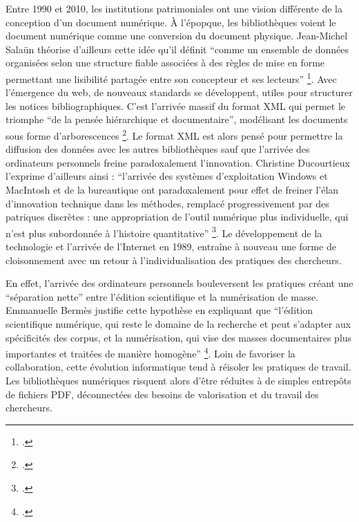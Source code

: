 Entre 1990 et 2010, les institutions patrimoniales ont une vision différente de la conception d'un document numérique. À l'épopque, les bibliothèques voient le document numérique comme une conversion du document physique. Jean-Michel Salaün théorise d'ailleurs cette idée qu'il définit \enquote{comme un ensemble de données organisées selon une structure fiable associées à des règles de mise en forme permettant une lisibilité partagée entre son concepteur et ses lecteurs} \footcite{pedauqueDocumentLumiereNumerique2006}. Avec l'émergence du web, de nouveaux standards se développent, utiles pour structurer les notices bibliographiques. C'est l'arrivée massif du format \ac{XML} qui permet le triomphe \enquote{de la pensée hiérarchique et documentaire}, modélisant les documents sous forme d'arborescences \footcite{bermesTroisAgesNumerique}. Le format \ac{XML} est alors pensé pour permettre la diffusion des données avec les autres bibliothèques sauf que l'arrivée des ordinateurs personnels freine paradoxalement l'innovation. Christine Ducourtieux l'exprime d'ailleurs ainsi : \enquote{l'arrivée des systèmes d'exploitation Windows et MacIntosh et de la bureautique ont paradoxalement pour effet de freiner l'élan d'innovation technique dans les méthodes, remplacé progressivement par des patriques discrètes : une appropriation de l'outil numérique plus individuelle, qui n'est plus subordonnée à l'histoire quantitative} \footcite{bermesTroisAgesNumerique}. Le développement de la technologie et l'arrivée de l'Internet en 1989, entraîne à nouveau une forme de cloisonnement avec un retour à l'individualisation des pratiques des chercheurs. 

En effet, l'arrivée des ordinateurs personnels bouleversent les pratiques créant une \enquote{séparation nette} entre l'édition scientifique et la numérisation de masse. Emmanuelle Bermès justifie cette hypothèse en expliquant que \enquote{l'édition scientifique numérique, qui reste le domaine de la recherche et peut s'adapter aux spécificités des corpus, et la numérisation, qui vise des masses documentaires plus importantes et traitées de manière homogène} \footcite{bermesTroisAgesNumerique}. Loin de favoriser la collaboration, cette évolution informatique tend à réisoler les pratiques de travail. Les bibliothèques numériques risquent alors d'être réduites à de simples entrepôts de fichiers \ac{PDF}, déconnectées des besoins de valorisation et du travail des chercheurs.

